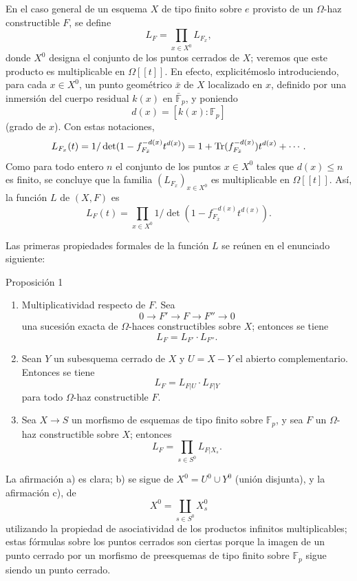 En el caso general de un esquema $X$ de tipo finito sobre $e$ provisto de un $\Omega$-haz constructible $F$, se define
\[
L_F=\prod_{x\in X^0}L_{F_x},
\]
donde $X^0$ designa el conjunto de los puntos cerrados de $X$; veremos que este producto es multiplicable en $\Omega[[t]]$. En efecto, explicitémoslo introduciendo, para cada $x\in X^0$, un punto geométrico $\bar x$ de $X$ localizado en $x$, definido por una inmersión del cuerpo residual $k(x)$ en $\bar{\mathbb F}_p$, y poniendo
\[
d(x)=[k(x):\mathbb F_p]
\]
(grado de $x$). Con estas notaciones,
\[
L_{F_x}(t)=1/\det(1-f_{F_{\bar x}}^{-d(x)}t^{d(x)})
 =1+\operatorname{Tr}(f_{F_{\bar x}}^{-d(x)})t^{d(x)}+\cdots .
\]
Como para todo entero $n$ el conjunto de los puntos $x\in X^0$ tales que $d(x)\le n$ es finito, se concluye que la familia $(L_{F_x})_{x\in X^0}$ es multiplicable en $\Omega[[t]]$. Así, la función $L$ de $(X,F)$ es
\[
L_F(t)=\prod_{x\in X^0}1/\det(1-f_{F_{\bar x}}^{-d(x)}t^{d(x)}).
\]

Las primeras propiedades formales de la función $L$ se reúnen en el enunciado siguiente:

\begin{statement}{Proposición 1}
\begin{enumerate}[label=\alph*)]
\item Multiplicatividad respecto de $F$. Sea
\[
0\longrightarrow F'\longrightarrow F\longrightarrow F''\longrightarrow0
\]
una sucesión exacta de $\Omega$-haces constructibles sobre $X$; entonces se tiene
\[
L_F=L_{F'}\cdot L_{F''}.
\]
\item Sean $Y$ un subesquema cerrado de $X$ y $U=X-Y$ el abierto complementario. Entonces se tiene
\[
L_F=L_{F|U}\cdot L_{F|Y}
\]
para todo $\Omega$-haz constructible $F$.
\item Sea $X\to S$ un morfismo de esquemas de tipo finito sobre $\mathbb F_p$, y sea $F$ un $\Omega$-haz constructible sobre $X$; entonces
\[
L_F=\prod_{s\in S^0}L_{F|X_s}.
\]
\end{enumerate}
\end{statement}

La afirmación a) es clara; b) se sigue de $X^0=U^0\cup Y^0$ (unión disjunta), y la afirmación c), de
\[
X^0=\coprod_{s\in S^0}X_s^0
\]
utilizando la propiedad de asociatividad de los productos infinitos multiplicables; estas fórmulas sobre los puntos cerrados son ciertas porque la imagen de un punto cerrado por un morfismo de preesquemas de tipo finito sobre $\mathbb F_p$ sigue siendo un punto cerrado.
